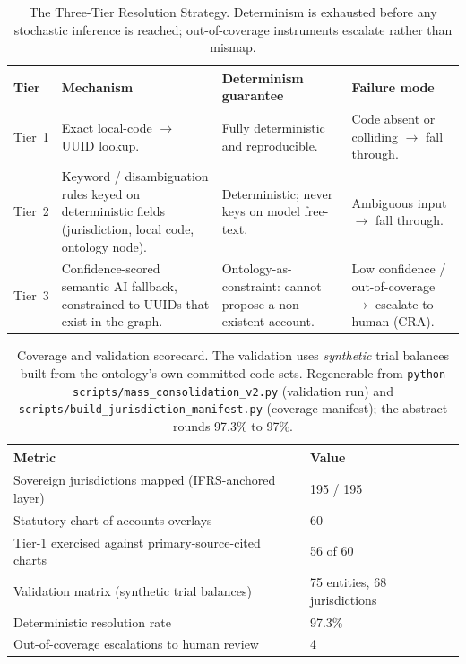 \begin{table}[H]
\centering
\small
\begin{tabular}{p{1.4cm} p{4.0cm} p{4.2cm} p{3.3cm}}
\toprule
\textbf{Tier} & \textbf{Mechanism} & \textbf{Determinism guarantee} & \textbf{Failure mode} \\
\midrule
Tier~1 &
Exact local-code $\rightarrow$ UUID lookup. &
Fully deterministic and reproducible. &
Code absent or colliding $\rightarrow$ fall through. \\
\addlinespace
Tier~2 &
Keyword / disambiguation rules keyed on deterministic fields (jurisdiction,
local code, ontology node). &
Deterministic; never keys on model free-text. &
Ambiguous input $\rightarrow$ fall through. \\
\addlinespace
Tier~3 &
Confidence-scored semantic AI fallback, constrained to UUIDs that exist in the
graph. &
Ontology-as-constraint: cannot propose a non-existent account. &
Low confidence / out-of-coverage $\rightarrow$ escalate to human (CRA). \\
\bottomrule
\end{tabular}
\caption{The Three-Tier Resolution Strategy. Determinism is exhausted before any
stochastic inference is reached; out-of-coverage instruments escalate rather than
mismap.}
\label{tab:three-tier}
\end{table}

\begin{table}[H]
\centering
\small
\begin{tabular}{p{7.5cm} p{4.5cm}}
\toprule
\textbf{Metric} & \textbf{Value} \\
\midrule
Sovereign jurisdictions mapped (IFRS-anchored layer) & 195 / 195 \\
Statutory chart-of-accounts overlays & 60 \\
Tier-1 exercised against primary-source-cited charts & 56 of 60 \\
Validation matrix (synthetic trial balances) & 75 entities, 68 jurisdictions \\
Deterministic resolution rate & 97.3\% \\
Out-of-coverage escalations to human review & 4 \\
\bottomrule
\end{tabular}
\caption{Coverage and validation scorecard. The validation uses \emph{synthetic}
trial balances built from the ontology's own committed code sets. Regenerable
from \texttt{python scripts/mass\_consolidation\_v2.py} (validation run) and
\texttt{scripts/build\_jurisdiction\_manifest.py} (coverage manifest); the
abstract rounds 97.3\% to 97\%.}
\label{tab:scorecard}
\end{table}
